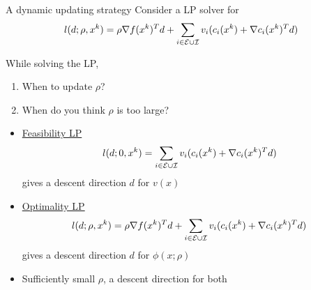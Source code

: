 \documentclass[8pt]{beamer}
\begin{document}
\begin{frame}{A dynamic updating strategy}
Consider a LP solver for 
\[
l(d; \rho, x^k) = \rho \nabla f(x^k)^Td + \sum_{i\in{\cal E}\cup{\cal I}} v_i( c_i(x^k) + \nabla c_i(x^k)^Td)
\]

While solving the LP,
\begin{enumerate}
\item {\color{blue} When} to update $\rho$?
\item {\color{blue} When} do you think $\rho$ is too large?
\end{enumerate}

 \vfill
 
 \begin{itemize}
\item \underline{Feasibility LP }
\[
l(d; 0, x^k) = \sum_{i\in{\cal E}\cup{\cal I}} v_i( c_i(x^k) + \nabla c_i(x^k)^Td)
\]
gives a descent direction $d$ for $v(x)$

\vfill

\item \underline{Optimality LP}
\[
l(d; \rho, x^k) = \rho \nabla f(x^k)^Td + \sum_{i\in{\cal E}\cup{\cal I}} v_i( c_i(x^k) + \nabla c_i(x^k)^Td)
\]
gives a descent direction $d$ for $\phi(x;\rho)$

\vfill


\item Sufficiently small $\rho$, a descent direction for {\red  both}
\end{itemize}


\end{frame}



 
\end{document}

